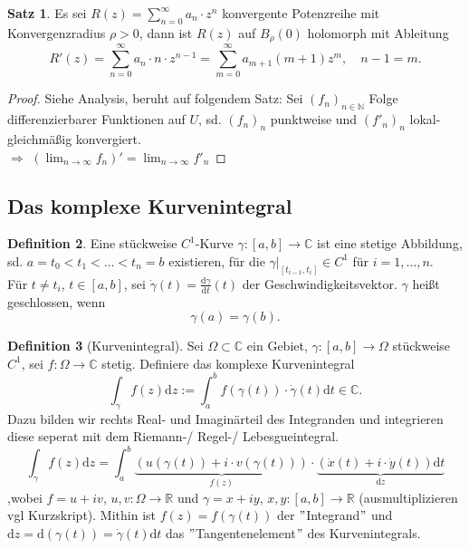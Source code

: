 \documentclass[11pt,titlepage]{article}
\theoremstyle{definition}
\newtheorem{theorem}{Satz}[section]
\newtheorem{definition}[theorem]{Definition}
\theoremstyle{remark}
\begin{document}
	\begin{theorem}
		Es sei $R(z)=\sum_{n=0}^{\infty} a_n \cdot z^n $ konvergente Potenzreihe mit 
		Konvergenzradius $\rho >0$, dann ist $R(z)$ auf $B_{\rho}(0)$ holomorph mit Ableitung 
		\[R'(z)=\sum_{n=0}^{\infty} a_n \cdot n\cdot z^{n-1} =\sum_{m=0}^{\infty}a_{m+1}(m+1)z^m,\quad
		n-1=m.\]
	\end{theorem}
	
	\begin{proof}
		Siehe Analysis, beruht auf folgendem Satz: Sei $(f_n)_{n\in\mathbb{N}}$ Folge differenzierbarer 
		Funktionen auf $U$, sd. $(f_n)_n$ punktweise und $(f'_n)_n$ lokal-gleichmäßig konvergiert. \\
		$\Rightarrow$ $(\lim_{n\to\infty} f_n)'=\lim_{n\to\infty}f'_n$
	\end{proof}
	
	\subsection{Das komplexe Kurvenintegral}
	
	\begin{definition}
		Eine stückweise $C^1$-Kurve $\gamma:[a,b]\to\mathbb{C}$ ist eine stetige Abbildung, sd. 
		$a=t_0 < t_1 <\ldots<t_n=b$ existieren, für die $\gamma |_{ [t_{i-1},t_i]}\in C^1$ für 
		$i=1,\ldots ,n$. \\
		Für $t\neq t_i$, $t\in [a,b]$, sei $\dot{\gamma}(t)=\frac{\mathrm{d}\gamma}{\mathrm{d}t}(t)$ der 
		Geschwindigkeitsvektor. $\gamma$ heißt geschlossen, wenn \[\gamma(a)=\gamma(b).\]
	\end{definition}
	
	\begin{definition}[Kurvenintegral]
		Sei $\Omega\subset\mathbb{C}$ ein Gebiet, $\gamma:[a,b]\to\Omega$ stückweise $C^1$, sei 
		$f:\Omega\to\mathbb{C}$ stetig. Definiere das komplexe Kurvenintegral
		\[ \int_{\gamma} f(z)\mathrm{d}z :=\int_a^b f(\gamma(t))\cdot \dot{\gamma}(t) 
		\mathrm{d}t \in \mathbb{C}. \]
		Dazu bilden wir rechts Real- und Imaginärteil des Integranden und 
		integrieren diese seperat mit dem Riemann-/ Regel-/ Lebesgueintegral.
		\[ \int_{\gamma} f(z)\mathrm{d}z =\int_a^b \underbrace{(u(\gamma(t))+i\cdot v(\gamma(t)))}_{f(z)}
		\cdot \underbrace{(\dot{x}(t)+i\cdot \dot{y}(t))\mathrm{d}t}_{\mathrm{d}z} \]
		,wobei $f=u+iv$, $u,v:\Omega\to\mathbb{R}$ und $\gamma =x+iy$, $x,y:[a,b]\to\mathbb{R}$ 
		(ausmultiplizieren vgl Kurzskript).  Mithin ist $f(z)=f(\gamma(t))$ der $"$Integrand$"$ und 
		$\mathrm{d}z=\mathrm{d}(\gamma(t))=\dot{\gamma}(t)\mathrm{d}t$ das 
		$"$Tangentenelement$"$ des Kurvenintegrals.
	\end{definition}
	
\end{document}
